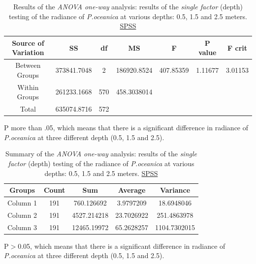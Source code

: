 \documentclass[10pt, a4paper]{article}
\begin{document}
\begin{appendices}
\begin{table}[htbp]
	\caption{Results of the \textit{ANOVA one-way} analysis: results of the \textit{single factor} (depth) testing of the radiance of \textit{P.oceanica} at various depths: 0.5, 1.5 and 2.5 meters. \href{http://www.spss.com/}{SPSS}}\label{tab:8}
	\begin{center}
	\begin{tabular}{|c|c|c|c|c|c|c|}
		\hline\hline
		\textbf{Source of Variation} & \textbf{SS} & \textbf{df} & \textbf{MS} & \textbf{F} & \textbf{P value} & \textbf{F crit} \\ \hline
		Between Groups & 373841.7048 & 2 & 186920.8524 & 407.85359 & 1.11677 & 3.01153 \\ \hline
		Within Groups & 261233.1668 & 570 & 458.3038014 & & & \\ \hline
		Total &  635074.8716 & 572 & & & & \\ \hline
	\end{tabular}
	\end{center} 
	P more than .05, which means that there is a significant difference in radiance of \textit{P.oceanica} at three different depth (0.5, 1.5 and 2.5). 
	
\end{table}

\begin{table}[htbp]
	\caption{Summary of the \textit{ANOVA one-way} analysis: results of the \textit{single factor} (depth) testing of the radiance of \textit{P.oceanica} at various depths: 0.5, 1.5 and 2.5 meters. \href{http://www.spss.com/}{SPSS}}\label{tab:A.7}
	\begin{center}
	\begin{tabular}{|c|c|c|c|c|}
		\hline\hline
		\textbf{Groups} & \textbf{Count} & \textbf{Sum} & \textbf{Average} & \textbf{Variance} \\ \hline\hline
		Column 1 & 191 &	760.126692 & 3.9797209 & 18.6948046 \\ \hline
		Column 2 & 191 &	4527.214218 & 23.7026922  & 251.4863978 \\ \hline
		Column 3 & 191 &	12465.19972 & 65.2628257 & 1104.7302015 \\ \hline
	\end{tabular}
	\end{center}
	P$>$0.05, which means that there is a significant difference in radiance of \textit{P.oceanica} at three different depth (0.5, 1.5 and 2.5). 
 	

\end{table}
\end{appendices}
\end{document}
